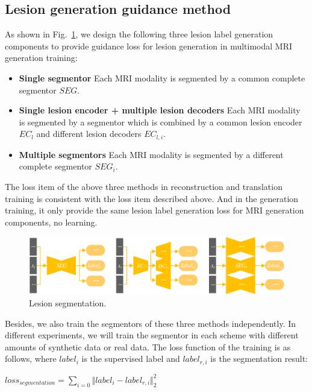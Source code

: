 \documentclass[letterpaper]{article} %
\begin{document}
\subsection{Lesion generation guidance method}
\label{label gen methods}
As shown in Fig.~\ref{segmentation}, we design the following three lesion label generation components to provide guidance loss for lesion generation in multimodal MRI generation training:
\begin{itemize}
	\item \textbf{Single segmentor} 
	Each MRI modality  is segmented by a common complete segmentor $SEG$.
	\item \textbf{Single lesion encoder + multiple lesion decoders} 
	Each MRI modality  is segmented by a segmentor which is combined by a common lesion encoder $EC_{l}$ and different lesion decoders $EC_{l,i}$. 
	\item \textbf{Multiple segmentors} 
	Each MRI modality  is segmented by a different complete segmentor $SEG_i$.
\end{itemize}
The loss item of the above three methods in reconstruction and translation training is consistent with the loss item described above. And in the generation training, it only provide the same lesion label generation loss for MRI generation components, no learning.

\begin{figure}
	\centering
	\includegraphics[width=0.8\columnwidth]{figures/segmentation}
	\caption{Lesion segmentation.}
	\label{segmentation}
\end{figure}
Besides, we also train the segmentors of these three methods independently. In different experiments, we will train the segmentor in each scheme with different amounts of synthetic data or real data. The loss function of the training is as follows, where $label_i$ is the supervised label and $label_{r,i}$ is the segmentation result:
\begin{center}
	$loss_{segmentation}=\sum\limits_{i=0}\Vert{label_i-label_{r,i}}\Vert_{2}^{2}$
\end{center}
\end{document}
